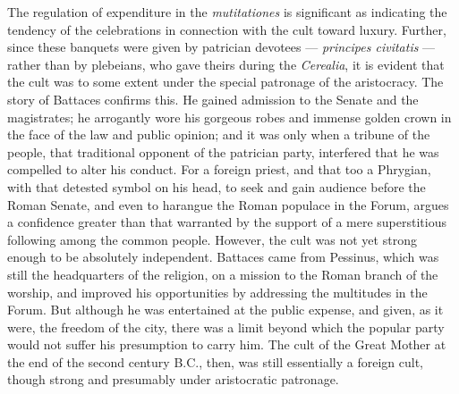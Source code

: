 \documentclass[a4paper, 11pt, oneside, polutonikogreek, english]{article}
\begin{document}
The regulation of expenditure in the \emph{mutitationes} is significant as indicating the tendency of the celebrations in connection with the cult toward luxury. Further, since these banquets were given by patrician devotees --- \emph{principes civitatis} --- rather than by plebeians, who gave theirs during the \emph{Cerealia}, it is evident that the cult was to some extent under the special patronage of the aristocracy. The story of Battaces confirms this. He gained admission to the Senate and the magistrates; he arrogantly wore his gorgeous robes and immense golden crown in the face of the law and public opinion; and it was only when a tribune of the people, that traditional opponent of the patrician party, interfered that he was compelled to alter his conduct. For a foreign priest, and that too a Phrygian, with that detested symbol on his head, to seek and gain audience before the Roman Senate, and even to harangue the Roman populace in the Forum, argues a confidence greater than that warranted by the support of a mere superstitious following among the common people. However, the cult was not yet strong enough to be absolutely independent. Battaces came from Pessinus, which was still the headquarters of the religion, on a mission to the Roman branch of the worship, and improved his opportunities by addressing the multitudes in the Forum. But although he was entertained at the public expense, and given, as it were, the freedom of the city, there was a limit beyond which the popular party would not suffer his presumption to carry him. The cult of the Great Mother at the end of the second century \textsc{B.C.}, then, was still essentially a foreign cult, though strong and presumably under aristocratic patronage.
\end{document}

